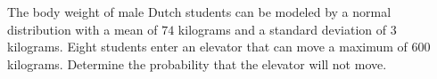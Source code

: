 The body weight of male Dutch students can be modeled by a normal distribution with a mean of $74$ kilograms and a standard deviation of $3$ kilograms.
Eight students enter an elevator that can move a maximum of $600$ kilograms.
Determine the probability that the elevator will not move. 